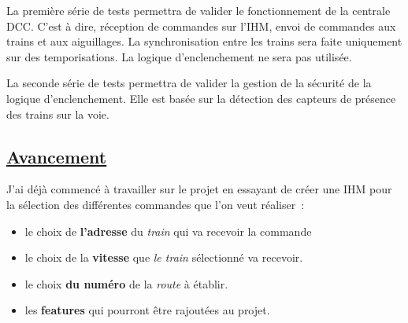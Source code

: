 La première série de tests permettra de valider le fonctionnement de la
centrale DCC. C'est à dire, réception de commandes sur l'IHM, envoi de
commandes aux trains et aux aiguillages. La synchronisation entre les
trains sera faite uniquement sur des temporisations. La logique
d'enclenchement ne sera pas utilisée.

La seconde série de tests permettra de valider la gestion de la sécurité
de la logique d'enclenchement. Elle est basée sur la détection des
capteurs de présence des trains sur la voie. 


\subsection{\underline{Avancement}}
\label{sec:avanc}

J'ai d\'ej\`a commenc\'e \`a travailler sur le projet en essayant de
cr\'eer une IHM pour la s\'election des diff\'erentes commandes que l'on
veut r\'ealiser~:

\begin{itemize}
    \item le choix de \textbf{l'adresse} du \emph{train} qui va
      recevoir la commande
    \item le choix de la \textbf{vitesse} que \emph{le train} s\'electionn\'e
      va recevoir. 
    \item le choix  \textbf{du numéro} de la \emph{route} \`a \'etablir.
    \item les \textbf{features} qui pourront \^etre rajout\'ees au
      projet. 
  \end{itemize}

\newpage

